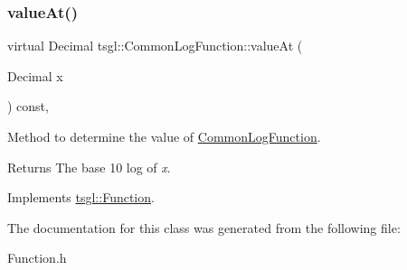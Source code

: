 \subsubsection{\texorpdfstring{value\+At()}{valueAt()}}
{\footnotesize\ttfamily virtual Decimal tsgl\+::\+Common\+Log\+Function\+::value\+At (\begin{DoxyParamCaption}\item[{Decimal}]{x }\end{DoxyParamCaption}) const\hspace{0.3cm}{\ttfamily [inline]}, {\ttfamily [virtual]}}



Method to determine the value of \hyperlink{classtsgl_1_1_common_log_function}{Common\+Log\+Function}. 

\begin{DoxyReturn}{Returns}
The base 10 log of {\itshape x}. 
\end{DoxyReturn}


Implements \hyperlink{classtsgl_1_1_function_affb7b3b19a04efefa29a9870d666e912}{tsgl\+::\+Function}.



The documentation for this class was generated from the following file\+:\begin{DoxyCompactItemize}
\item 
Function.\+h\end{DoxyCompactItemize}
